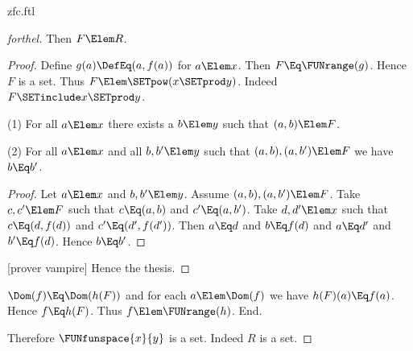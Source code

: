 \documentclass{stex}
\begin{document}
\begin{smodule}{zfc.ftl}
\begin{proof}[forthel]
    Then $F \Elem R$.
    \begin{proof}
      Define $g(a) \DefEq (a,f(a))$ for $a \Elem x$.
      Then $F \Eq \FUNrange(g)$.
      Hence $F$ is a set.
      Thus $F \Elem \SETpow(x \SETprod y)$.
      Indeed $F \SETinclude x \SETprod y$.

      (1) For all $a \Elem x$ there exists a $b \Elem y$ such that $(a,b) \Elem F$.

      (2) For all $a \Elem x$ and all $b, b' \Elem y$ such that $(a,b),
      (a,b') \Elem F$ we have $b \Eq b'$.
      \begin{proof}
        Let $a \Elem x$ and $b, b' \Elem y$.
        Assume $(a,b), (a,b') \Elem F$.
        Take $c, c' \Elem F$ such that $c \Eq (a,b)$ and $c' \Eq (a,b')$.
        Take $d, d' \Elem x$ such that $c \Eq (d,f(d))$ and $c' \Eq (d',f(d'))$.
        Then $a \Eq d$ and $b \Eq f(d)$ and $a \Eq d'$ and $b' \Eq f(d)$.
        Hence $b \Eq b'$.
      \end{proof}

      [prover vampire]
      Hence the thesis.
    \end{proof}

    $\Dom(f) \Eq \Dom(h(F))$ and for each $a \Elem \Dom(f)$ we have $h(F)(a) \Eq f(a)$.
    Hence $f \Eq h(F)$.
    Thus $f \Elem \FUNrange(h)$.
  End.

  Therefore $\FUNfunspace{x}{y}$ is a set.
  Indeed $R$ is a set.
\end{proof}
\end{smodule}
\end{document}
